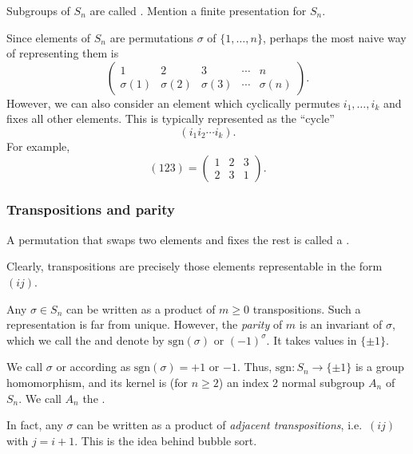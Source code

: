 Subgroups of $S_n$ are called .
Mention a finite presentation for $S_n$. %

Since elements of $S_n$ are permutations $\sigma$ of $\{ 1, \ldots, n \}$, perhaps the most naive way of representing them is
\[ \begin{pmatrix} 1 & 2 & 3 & \cdots & n \\ \sigma(1) & \sigma(2) & \sigma(3) & \cdots & \sigma(n) \end{pmatrix}. \]
However, we can also consider an element which cyclically permutes $i_1, \ldots, i_k$ and fixes all other elements. This is typically represented as the ``cycle''
\[ (i_1 i_2 \cdots i_k). \]
For example,
\[ (1 2 3) = \begin{pmatrix} 1 & 2 & 3 \\ 2 & 3 & 1 \end{pmatrix}. \]

\subsubsection{Transpositions and parity}

\begin{definition}
A permutation that swaps two elements and fixes the rest is called a .
\end{definition}

Clearly, transpositions are precisely those elements representable in the form $(i j)$. 

\begin{proposition}
Any $\sigma \in S_n$ can be written as a product of $m \geq 0$ transpositions. Such a representation is far from unique. However, the \emph{parity} of $m$ is an invariant of $\sigma$, which we call the  and denote by $\mathrm{sgn}(\sigma)$ or $(-1)^\sigma$. It takes values in $\{ \pm 1 \}$.
\end{proposition}

We call $\sigma$  or  according as $\mathrm{sgn}(\sigma) = +1$ or $-1$. Thus, $\mathrm{sgn} : S_n \to \{ \pm 1 \}$ is a group homomorphism, and its kernel is (for $n \geq 2$) an index 2 normal subgroup $A_n$ of $S_n$. We call $A_n$ the .

\begin{remark}
In fact, any $\sigma$ can be written as a product of \emph{adjacent transpositions}, i.e.\ $(i j)$ with $j=i+1$. This is the idea behind bubble sort.
\end{remark}

